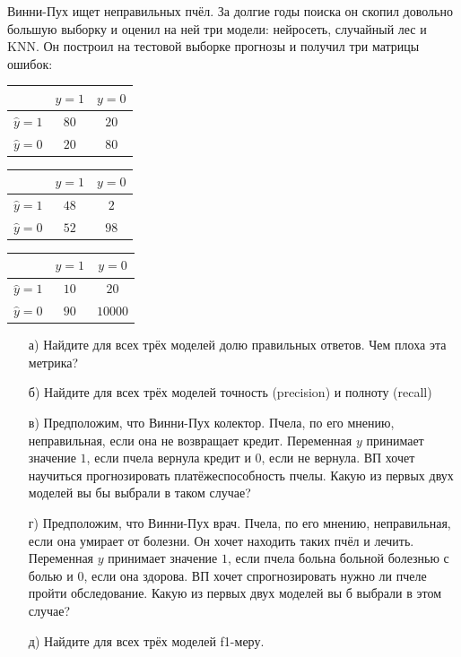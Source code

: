 \documentclass[12pt, a4paper, oneside]{article}
\theoremstyle{plain} %
\theoremstyle{definition}
\newcounter{problem}%
\renewcommand{\theproblem}{\arabic{problem}}
\newenvironment{problem}{
\addtocounter{problem}{1}\noindent{ \color{titleblue} \large \bfseries Упражнение~\theproblem \vspace{1ex} \newline}
}{ }
\begin{document}
\begin{problem}
Винни-Пух ищет неправильных пчёл. За долгие годы поиска он скопил довольно большую выборку и оценил на ней три модели: нейросеть, случайный лес и KNN. Он построил на тестовой выборке прогнозы и получил три матрицы ошибок: 

\begin{minipage}[t]{0.3\linewidth}
	\begin{tabular}{|c|c|c|}
		\hline
		& $y=1$  &  $ y = 0$ \\  \hline 
		$\hat y = 1$  &   $80$ &    $20$ \\      \hline 
		$\hat y = 0$ &   $20$ &     $80$ \\      \hline 
	\end{tabular}
\end{minipage}
\hfill
\begin{minipage}[t]{0.3\linewidth}
	\begin{tabular}{|c|c|c|}
		\hline
		& $y=1$  &  $ y = 0$ \\  \hline 
		$\hat y = 1$  &   $48$ &    $2$ \\      \hline 
		$\hat y = 0$ &   $52$ &     $98$ \\      \hline 
	\end{tabular}
\end{minipage}
\hfill
\begin{minipage}[t]{0.3\linewidth}
	\begin{tabular}{|c|c|c|}
		\hline
		& $y=1$  &  $ y = 0$ \\  \hline 
		$\hat y = 1$  &   $10$ &    $20$ \\         \hline 
		$\hat y = 0$ &   $90$ &    $10000$ \\   \hline 
	\end{tabular}
\end{minipage}

\begin{enumerate}
	\item[а)]   Найдите для всех трёх моделей долю правильных ответов. Чем плоха эта метрика? 
	\item[б)]   Найдите для всех трёх моделей точность (precision) и полноту (recall)
	\item[в)]   Предположим, что Винни-Пух колектор. Пчела, по его мнению, неправильная, если она не возвращает кредит. Переменная $y$ принимает значение $1$, если пчела вернула кредит  и $0$, если не вернула. ВП хочет научиться прогнозировать платёжеспособность пчелы. Какую из первых двух моделей вы бы выбрали в таком случае? 
	\item[г)]  Предположим, что Винни-Пух врач. Пчела, по его мнению, неправильная, если она умирает от болезни. Он хочет находить таких пчёл и лечить. Переменная $y$ принимает значение $1$, если пчела больна больной болезнью с болью и $0$, если она здорова. ВП хочет спрогнозировать нужно ли пчеле пройти обследование. Какую из первых двух моделей вы б выбрали в этом случае? 
	\item[д)] Найдите для всех трёх моделей f1-меру. 
\end{enumerate}
\end{problem}
\end{document}

